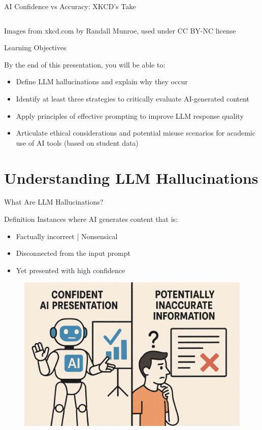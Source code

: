 \documentclass{beamer}
\begin{document}
\begin{frame}{AI Confidence vs Accuracy: XKCD's Take}
\begin{columns}
  \end{columns}
  \vspace{0.5cm}
  {\tiny Images from xkcd.com by Randall Munroe, used under CC BY-NC license}
\end{frame}

\begin{frame}{Learning Objectives}
\begin{block}{By the end of this presentation, you will be able to:}
\begin{itemize}
  \item Define LLM hallucinations and explain why they occur
  \item Identify at least three strategies to critically evaluate AI-generated content
  \item Apply principles of effective prompting to improve LLM response quality
  \item Articulate ethical considerations and potential misuse scenarios for academic use of AI tools (based on student data)
\end{itemize}
\end{block}
\end{frame}

\section{Understanding LLM Hallucinations}

\begin{frame}{What Are LLM Hallucinations?}
\begin{block}{Definition}
Instances where AI generates content that is:
\begin{itemize}
  \item Factually incorrect | Nonsensical
  \item Disconnected from the input prompt
  \item Yet presented with high confidence
\end{itemize}
\end{block}

\alert{} %
\begin{figure}
    \centering
    \includegraphics[width=0.5\linewidth]{../src/cs12/images/cs12-ai-hallucination_example.png}
\end{figure}
\end{frame}
\end{document}
